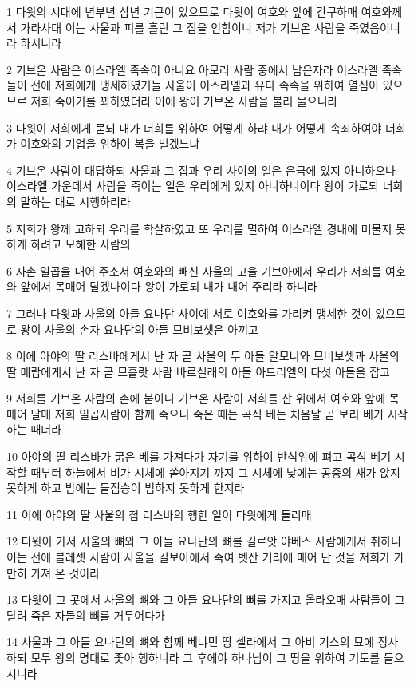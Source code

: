 \par 1 다윗의 시대에 년부년 삼년 기근이 있으므로 다윗이 여호와 앞에 간구하매 여호와께서 가라사대 이는 사울과 피를 흘린 그 집을 인함이니 저가 기브온 사람을 죽였음이니라 하시니라
\par 2 기브온 사람은 이스라엘 족속이 아니요 아모리 사람 중에서 남은자라 이스라엘 족속들이 전에 저희에게 맹세하였거늘 사울이 이스라엘과 유다 족속을 위하여 열심이 있으므로 저희 죽이기를 꾀하였더라 이에 왕이 기브온 사람을 불러 물으니라
\par 3 다윗이 저희에게 묻되 내가 너희를 위하여 어떻게 하랴 내가 어떻게 속죄하여야 너희가 여호와의 기업을 위하여 복을 빌겠느냐
\par 4 기브온 사람이 대답하되 사울과 그 집과 우리 사이의 일은 은금에 있지 아니하오나 이스라엘 가운데서 사람을 죽이는 일은 우리에게 있지 아니하니이다 왕이 가로되 너희의 말하는 대로 시행하리라
\par 5 저희가 왕께 고하되 우리를 학살하였고 또 우리를 멸하여 이스라엘 경내에 머물지 못하게 하려고 모해한 사람의
\par 6 자손 일곱을 내어 주소서 여호와의 빼신 사울의 고을 기브아에서 우리가 저희를 여호와 앞에서 목매어 달겠나이다 왕이 가로되 내가 내어 주리라 하니라
\par 7 그러나 다윗과 사울의 아들 요나단 사이에 서로 여호와를 가리켜 맹세한 것이 있으므로 왕이 사울의 손자 요나단의 아들 므비보셋은 아끼고
\par 8 이에 아야의 딸 리스바에게서 난 자 곧 사울의 두 아들 알모니와 므비보셋과 사울의 딸 메랍에게서 난 자 곧 므흘랏 사람 바르실래의 아들 아드리엘의 다섯 아들을 잡고
\par 9 저희를 기브온 사람의 손에 붙이니 기브온 사람이 저희를 산 위에서 여호와 앞에 목매어 달매 저희 일곱사람이 함께 죽으니 죽은 때는 곡식 베는 처음날 곧 보리 베기 시작하는 때더라
\par 10 아야의 딸 리스바가 굵은 베를 가져다가 자기를 위하여 반석위에 펴고 곡식 베기 시작할 때부터 하늘에서 비가 시체에 쏟아지기 까지 그 시체에 낮에는 공중의 새가 앉지 못하게 하고 밤에는 들짐승이 범하지 못하게 한지라
\par 11 이에 아야의 딸 사울의 첩 리스바의 행한 일이 다윗에게 들리매
\par 12 다윗이 가서 사울의 뼈와 그 아들 요나단의 뼈를 길르앗 야베스 사람에게서 취하니 이는 전에 블레셋 사람이 사울을 길보아에서 죽여 벳산 거리에 매어 단 것을 저희가 가만히 가져 온 것이라
\par 13 다윗이 그 곳에서 사울의 뼈와 그 아들 요나단의 뼈를 가지고 올라오매 사람들이 그 달려 죽은 자들의 뼈를 거두어다가
\par 14 사울과 그 아들 요나단의 뼈와 함께 베냐민 땅 셀라에서 그 아비 기스의 묘에 장사하되 모두 왕의 명대로 좇아 행하니라 그 후에야 하나님이 그 땅을 위하여 기도를 들으시니라
